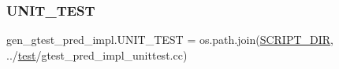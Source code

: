 \mbox{\label{namespacegen__gtest__pred__impl_a8c1cb8e87c4bd84edbb958f73b7df200}} 
\subsubsection{\texorpdfstring{UNIT\_TEST}{UNIT\_TEST}}
{\footnotesize\ttfamily gen\+\_\+gtest\+\_\+pred\+\_\+impl.\+U\+N\+I\+T\+\_\+\+T\+E\+ST = os.\+path.\+join(\mbox{\hyperlink{namespacegen__gtest__pred__impl_aed087c7fc787a064f0a9fd5f5f9f6487}{S\+C\+R\+I\+P\+T\+\_\+\+D\+IR}}, \textquotesingle{}../\mbox{\hyperlink{_mutual_8h_a707ee03719e99670bf6cfdfd897b8456}{test}}/gtest\+\_\+pred\+\_\+impl\+\_\+unittest.\+cc\textquotesingle{})}

